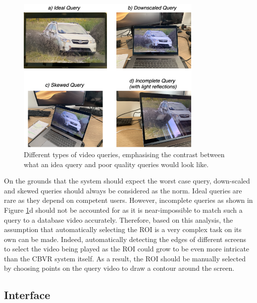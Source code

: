 \begin{figure}[h]
\centerline{\includegraphics[width=0.8\textwidth]{figures/design/difference-query-video-issues.png}}
\caption{\label{fig:difference-query-video-issues}Different types of video queries, emphasising the contrast between what an idea query and poor quality queries would look like.}
\end{figure}

On the grounds that the system should expect the worst case query, down-scaled and skewed queries should always be considered as the norm. Ideal queries are rare as they depend on competent users. However, incomplete queries as shown in Figure \ref{fig:difference-query-video-issues}d should not be accounted for as it is near-impossible to match such a query to a database video accurately. Therefore, based on this analysis, the assumption that automatically selecting the ROI is a very complex task on its own can be made. Indeed, automatically detecting the edges of different screens to select the video being played as the ROI could grow to be even more intricate than the CBVR system itself. As a result, the ROI should be manually selected by choosing points on the query video to draw a contour around the screen. 

\subsection{Interface}

